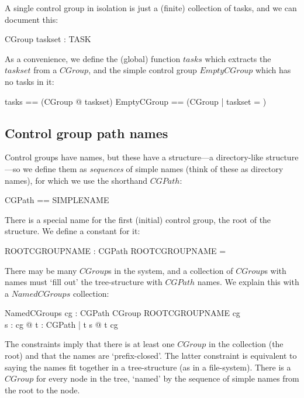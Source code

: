 \documentclass[a4paper,twoside,12pt]{article}
\begin{document}
A single control group in isolation is just a (finite) collection of tasks, and we can document this:

\begin{schema}{CGroup}
taskset : \finset TASK
\end{schema}

As a convenience, we define the (global) function $tasks$ which extracts the $taskset$ from a $CGroup$, and the
simple control group $EmptyCGroup$ which has no tasks in it:
\begin{zed}
tasks == (\lambda CGroup @ taskset)
\also
EmptyCGroup == (\mu CGroup | taskset = \emptyset )
\end{zed}

\subsection{Control group path names}

Control groups have names, but these have a structure---a directory-like structure---so we define them as \emph{sequences} of simple names 
(think of these as directory names), for which we use the shorthand $CGPath$:

\begin{zed}
CGPath == \seq SIMPLENAME
\end{zed}

There is a special name for the first (initial) control group, the root of the structure. We define a constant for it:

\begin{axdef}{}
ROOTCGROUPNAME : CGPath
\where
ROOTCGROUPNAME = \langle \rangle
\end{axdef}

There may be many $CGroup$s in the system, and a collection of $CGroup$s with names must `fill out' the tree-structure with $CGPath$ names. 
We explain this with a $NamedCGroups$ collection:

\begin{schema}{NamedCGroups}
cg : CGPath \ffun CGroup
\where
ROOTCGROUPNAME \in \dom cg \\
\forall s : \dom cg @ \forall t : CGPath | t \subset s @ t \in \dom cg
\end{schema}
The constraints imply that there is  at least one $CGroup$ in the collection (the root) and that the names are `prefix-closed'. The latter constraint is equivalent to saying the names fit together in a tree-structure (as in a file-system).
There is a $CGroup$ for every node in the tree, `named' by the sequence of simple names from the root to the node.
\end{document}
